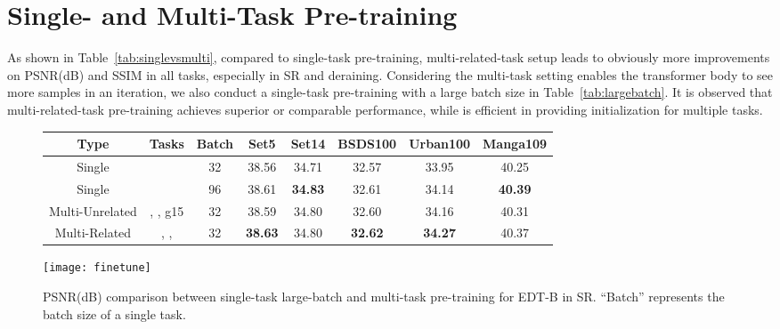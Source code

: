 \documentclass[runningheads]{llncs}
\begin{document}
	\section{Single- and Multi-Task Pre-training}
	\label{sec:singlemulti}
	
	As shown in Table~\ref{tab:singlevsmulti}, compared to single-task pre-training, multi-related-task setup leads to obviously more improvements on PSNR(dB) and SSIM in all tasks, especially in SR and deraining. Considering the multi-task setting enables the transformer body to see more samples in an iteration, we also conduct a single-task pre-training with a large batch size in Table~\ref{tab:largebatch}. It is observed that multi-related-task pre-training achieves superior or comparable performance, while is efficient in providing initialization for multiple tasks.
	
	
	\begin{figure}[t]
		\centering
		\begin{minipage}[c]{1.0\linewidth}
			\centering
			\caption{PSNR(dB) comparison between single-task large-batch and multi-task pre-training for EDT-B in  SR. ``Batch'' represents the batch size of a single task.}
			\vspace{0.15in}
			\renewcommand\arraystretch{1.1}
			\setlength\tabcolsep{2pt}
\begin{tabular}{| c | c | c | c c c c c |}
				\hline
				Type & Tasks & Batch & Set5 & Set14 & BSDS100 & Urban100 & Manga109 \\
				\hline
				Single &  & 32 & 38.56 & 34.71 & 32.57 & 33.95 & 40.25 \\
				Single &  & 96 & 38.61 & \textbf{34.83} & 32.61 & 34.14 & \textbf{40.39} \\
				Multi-Unrelated & , , g15 & 32 & 38.59 & 34.80 & 32.60 & 34.16 & 40.31 \\
				Multi-Related & , ,  & 32 & \textbf{38.63} & 34.80 & \textbf{32.62} & \textbf{34.27} & 40.37 \\
				\hline
			\end{tabular}
\label{tab:largebatch}
		\end{minipage}\vspace{0.2in}
		\begin{minipage}[c]{1.0\linewidth}
			\centering
			\texttt{[image: finetune]}
			\vspace{-0.2in}
			\label{fig:finetune}
		\end{minipage}
		\vspace{-0.1in}
	\end{figure}
	
\end{document}
